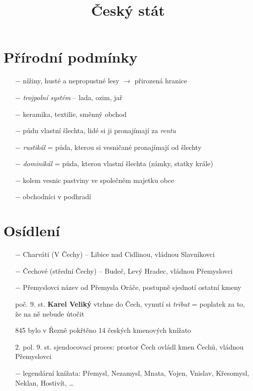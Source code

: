 \documentclass{article}
\title{\vspace{-2cm}Český stát\vspace{-1.7cm}}
\date{}
\author{}
\begin{document}
\maketitle
\section*{Přírodní podmínky}
\begin{itemize}
    \vspace{-0.5em}
    \setlength\itemsep{0.15em}
    \item[$-$] nížiny, husté a nepropustné lesy $\rightarrow$ přirozená hranice
    \item[$-$] \textit{trojpolní systém} -- lada, ozim, jař
    \item[$-$] keramika, textilie, směnný obchod
    \item[$-$] půdu vlastní šlechta, lidé si ji pronajímají za \textit{rentu}
    \item[$-$] \textit{rustikál} = půda, kterou si vesničané pronajímají od šlechty
    \item[$-$] \textit{dominikál} = půda, kterou vlastní šlechta (zámky, statky krále)
    \item[$-$] kolem vesnic pastviny ve společném majetku obce
    \item[$-$] obchodníci v podhradí
\end{itemize}

\section*{Osídlení}
\begin{itemize}
    \vspace{-0.5em}
    \setlength\itemsep{0.15em}
    \item[$-$] Charváti (V Čechy) -- Libice nad Cidlinou, vládnou Slavníkovci
    \item[$-$] Čechové (střední Čechy) -- Budeč, Levý Hradec, vládnou Přemyslovci
    \item[$-$] Přemyslovci název od Přemysla Oráče, postupně sjednotí ostatní kmeny
\end{itemize}

\begin{itemize}
    \vspace{-0.5em}
    \setlength\itemsep{0.15em}
    \item[poč. 9. st.] \textbf{Karel Veliký} vtrhne do Čech, vynutí si \textit{tribut} = poplatek za to, že na ně nebude útočit
    \item[845] bylo v Řezně pokřtěno 14 českých kmenových knížato
    \item[2. pol. 9. st.] sjendocovací proces: prostor Čech ovládl kmen Čechů, vládnou Přemyslovci
    \item[$-$] legendární knížata: Přemysl, Nezamysl, Mnata, Vojen, Vnislav, Křesomysl, Neklan, Hostivít, \dots
\end{itemize}
\end{document}
